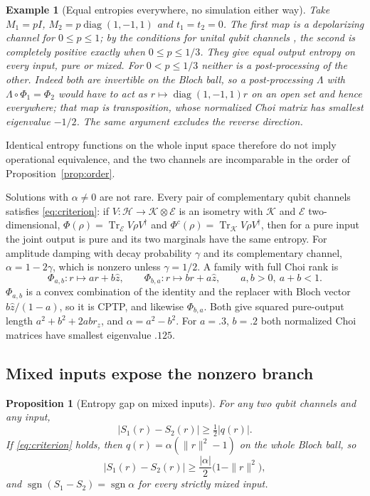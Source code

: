 \documentclass[12pt,a4paper]{article}
\newtheorem{proposition}[theorem]{Proposition}
\newtheorem{example}[theorem]{Example}
\begin{document}
\begin{example}[Equal entropies everywhere, no simulation either way]
\label{ex:reflection}
Take $M_1=pI$, $M_2=p\operatorname{diag}(1,-1,1)$ and $t_1=t_2=0$. The first map is a depolarizing channel for $0\le p\le1$; by the conditions for unital qubit channels \cite{FujiwaraAlgoet1999}, the second is completely positive exactly when $0\le p\le1/3$. They give equal output entropy on every input, pure or mixed. For $0<p\le1/3$ neither is a post-processing of the other. Indeed both are invertible on the Bloch ball, so a post-processing $\Lambda$ with $\Lambda\circ\Phi_1=\Phi_2$ would have to act as $r\mapsto\operatorname{diag}(1,-1,1)r$ on an open set and hence everywhere; that map is transposition, whose normalized Choi matrix has smallest eigenvalue $-1/2$. The same argument excludes the reverse direction.
\end{example}

Identical entropy functions on the whole input space therefore do not imply operational equivalence, and the two channels are incomparable in the order of Proposition~\ref{prop:order}.

Solutions with $\alpha\ne0$ are not rare. Every pair of complementary qubit channels satisfies \eqref{eq:criterion}: if $V:\mathcal H\to\mathcal K\otimes\mathcal E$ is an isometry with $\mathcal K$ and $\mathcal E$ two-dimensional, $\Phi(\rho)=\operatorname{Tr}_{\mathcal E}V\rho V^\dagger$ and $\Phi^c(\rho)=\operatorname{Tr}_{\mathcal K}V\rho V^\dagger$, then for a pure input the joint output is pure and its two marginals have the same entropy. For amplitude damping with decay probability $\gamma$ and its complementary channel, $\alpha=1-2\gamma$, which is nonzero unless $\gamma=1/2$. A family with full Choi rank is
\[
\Phi_{a,b}:r\mapsto ar+b\hat z,\qquad \Phi_{b,a}:r\mapsto br+a\hat z,\qquad a,b>0,\ a+b<1 .
\]
$\Phi_{a,b}$ is a convex combination of the identity and the replacer with Bloch vector $b\hat z/(1-a)$, so it is CPTP, and likewise $\Phi_{b,a}$. Both give squared pure-output length $a^2+b^2+2abr_z$, and $\alpha=a^2-b^2$. For $a=.3$, $b=.2$ both normalized Choi matrices have smallest eigenvalue $.125$.

\subsection{Mixed inputs expose the nonzero branch}

\begin{proposition}[Entropy gap on mixed inputs]
\label{prop:gap}
For any two qubit channels and any input,
\begin{equation}
|S_1(r)-S_2(r)|\ge\tfrac12|q(r)| .
\label{eq:gap-general}
\end{equation}
If \eqref{eq:criterion} holds, then $q(r)=\alpha(\|r\|^2-1)$ on the whole Bloch ball, so
\begin{equation}
|S_1(r)-S_2(r)|\ge\frac{|\alpha|}{2}\bigl(1-\|r\|^2\bigr),
\label{eq:gap}
\end{equation}
and $\operatorname{sgn}(S_1-S_2)=\operatorname{sgn}\alpha$ for every strictly mixed input.
\end{proposition}
\end{document}
